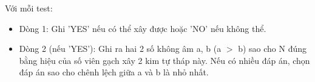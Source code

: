 Với mỗi test:
\begin{itemize}
	\item Dòng 1: Ghi 'YES' nếu có thể xây được hoặc 'NO' nếu không thể.
	\item Dòng 2 (nếu 'YES'): Ghi ra hai 2 số không âm a, b (a $>$ b) sao cho N đúng bằng hiệu của số viên gạch xây 2 kim tự tháp này. Nếu có nhiều đáp án, chọn đáp án sao cho chênh lệch giữa a và b là nhỏ nhất.
\end{itemize}

\